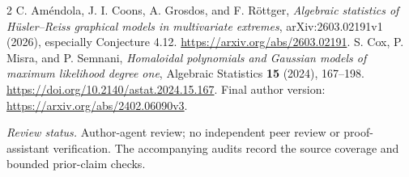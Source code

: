\documentclass[11pt]{article}
\begin{document}
\begin{thebibliography}{2}
 C. Am\'endola, J. I. Coons, A. Grosdos, and F. R\"ottger,
\emph{Algebraic statistics of H\"usler--Reiss graphical models in
multivariate extremes}, arXiv:2603.02191v1 (2026), especially
Conjecture 4.12. \url{https://arxiv.org/abs/2603.02191}.
 S. Cox, P. Misra, and P. Semnani,
\emph{Homaloidal polynomials and Gaussian models of maximum likelihood
degree one}, Algebraic Statistics \textbf{15} (2024), 167--198.
\url{https://doi.org/10.2140/astat.2024.15.167}.
Final author version: \url{https://arxiv.org/abs/2402.06090v3}.
\end{thebibliography}
\noindent\textit{Review status.} Author-agent review; no independent peer
review or proof-assistant verification. The accompanying audits record
the source coverage and bounded prior-claim checks.
\end{document}
